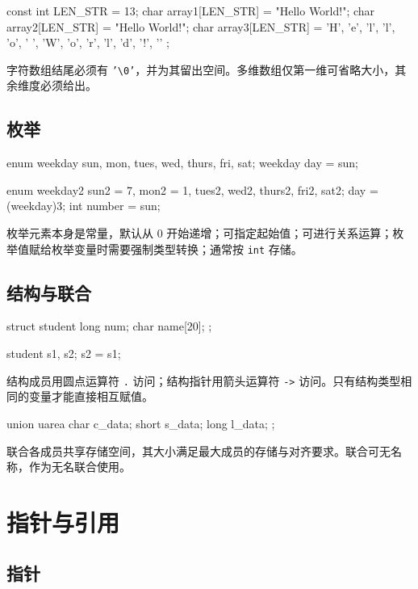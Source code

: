 \documentclass[UTF8,fontset=fandol,zihao=5]{ctexart}
\newcommand{\code}[1]{\texttt{#1}}
\begin{document}
\begin{cppcode}[字符数组]
const int LEN_STR = 13;
char array1[LEN_STR] = {"Hello World!"};
char array2[LEN_STR] = "Hello World!";
char array3[LEN_STR] = {
    'H', 'e', 'l', 'l', 'o', ' ',
    'W', 'o', 'r', 'l', 'd', '!', '\0'
};
\end{cppcode}

字符数组结尾必须有 \code{'\textbackslash0'}，并为其留出空间。多维数组仅第一维可省略大小，其余维度必须给出。

\subsection{枚举}

\begin{cppcode}[枚举]
enum weekday {sun, mon, tues, wed, thurs, fri, sat};
weekday day = sun;

enum weekday2 {sun2 = 7, mon2 = 1, tues2, wed2,
               thurs2, fri2, sat2};
day = (weekday)3;
int number = sun;
\end{cppcode}

枚举元素本身是常量，默认从 $0$ 开始递增；可指定起始值；可进行关系运算；枚举值赋给枚举变量时需要强制类型转换；通常按 \code{int} 存储。

\subsection{结构与联合}

\begin{cppcode}[结构]
struct student {
    long num;
    char name[20];
};

student s1{}, s2{};
s2 = s1;
\end{cppcode}

结构成员用圆点运算符 \code{.} 访问；结构指针用箭头运算符 \code{->} 访问。只有结构类型相同的变量才能直接相互赋值。

\begin{cppcode}[联合]
union uarea {
    char c_data;
    short s_data;
    long l_data;
};
\end{cppcode}

联合各成员共享存储空间，其大小满足最大成员的存储与对齐要求。联合可无名称，作为无名联合使用。

\section{指针与引用}

\subsection{指针}
\end{document}
